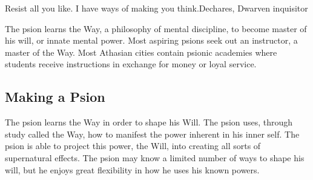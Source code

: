 {Resist all you like. I have ways of making you think.}{Dechares, Dwarven inquisitor}

The psion learns the Way, a philosophy of mental discipline, to become master of his will, or innate mental power. Most aspiring psions seek out an instructor, a master of the Way. Most Athasian cities contain psionic academies where students receive instructions in exchange for money or loyal service.


\subsection{Making a Psion}

The psion learns the Way in order to shape his Will. The psion uses, through study called the Way, how to manifest the power inherent in his inner self. The psion is able to project this power, the Will, into creating all sorts of supernatural effects. The psion may know a limited number of ways to shape his will, but he enjoys great flexibility in how he uses his known powers.

